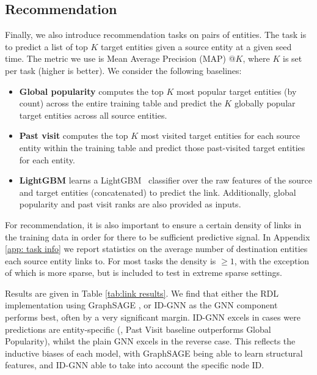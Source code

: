 \subsection{Recommendation}\label{sec:link_prediction}

Finally, we also introduce recommendation tasks on pairs of entities. The task is to predict a list of top $K$ target entities given a source entity at a given seed time.
The metric we use is Mean Average Precision (MAP) @$K$, where $K$ is set per task (higher is better). We consider the following baselines:
\begin{itemize}[leftmargin=0.6cm,itemsep=3pt, parsep=0pt]
    \item \textbf{Global popularity} computes the top $K$ most popular target entities (by count) across the entire training table and predict the $K$ globally popular target entities across all source entities.
    \item \textbf{Past visit} computes the top $K$ most visited target entities for each source entity within the training table and predict those past-visited target entities for each entity.
    \item \textbf{LightGBM} learns a LightGBM~\citep{ke2017lightgbm} classifier over the raw features of the source and target entities (concatenated) to predict the link. Additionally, global popularity and past visit ranks are also provided as inputs.
\end{itemize}


For recommendation, it is also important to ensure a certain density of links in the training data in order for there to be sufficient predictive signal. In Appendix \ref{app: task info} we report statistics on the average number of destination entities each source entity links to. For most tasks the density is $\geq 1$, with the exception of \stackex which is more sparse, but is included to test in extreme sparse settings.

 Results are given in Table \ref{tab:link results}. We find that either the RDL implementation using GraphSAGE \citep{hamilton2017inductive}, or ID-GNN \citep{you2021identity} as the GNN component performs best, often by a very significant margin. ID-GNN excels in cases were predictions are entity-specific (\ie, Past Visit baseline outperforms Global Popularity), whilst the plain GNN excels in the reverse case. This reflects the inductive biases of each model, with GraphSAGE being able to learn structural features, and ID-GNN able to take into account the specific node ID.

